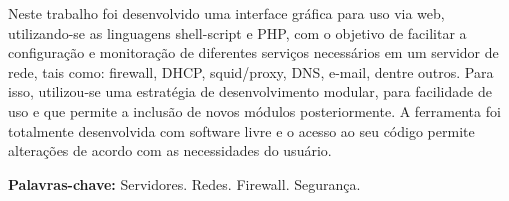 
\begin{resumo} 
\onehalfspacing  %
\vspace*{-0.5cm}
\noindent
Neste trabalho foi desenvolvido uma interface gráfica para uso via web, utilizando-se as linguagens shell-script e PHP, com o objetivo de facilitar a configuração e monitoração de diferentes serviços necessários em um servidor de rede, tais como:  firewall, DHCP, squid/proxy, DNS, e-mail, dentre outros. Para isso, utilizou-se uma estratégia de desenvolvimento modular, para facilidade de uso e que permite a inclusão de novos módulos posteriormente. A ferramenta foi totalmente desenvolvida com software livre e o acesso ao seu código permite alterações de acordo com as necessidades do usuário.

\vspace{1.2cm}
\noindent
\textbf{Palavras-chave:} Servidores. Redes. Firewall. Segurança.
\end{resumo}


